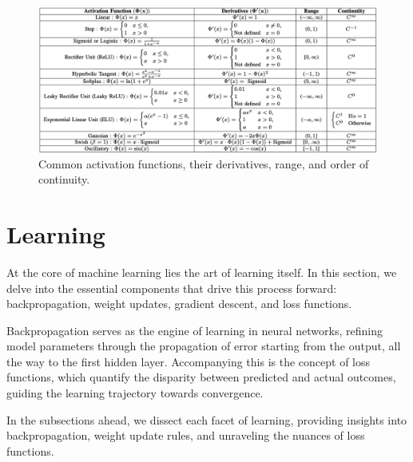 \documentclass{article}
\begin{document}
\begin{figure}[b]
  \label{actfun}
  \includegraphics{ActFunTable}
\caption{Common activation functions, their derivatives, range, and order of continuity.}
\end{figure}

\newpage
\section{Learning}
  \label{sec:Learning}
  At the core of machine learning lies the art of learning itself. In this section, we delve into the essential components that drive this process forward: backpropagation, weight updates, gradient descent, and loss functions.

Backpropagation serves as the engine of learning in neural networks, refining model parameters through the propagation of error starting from the output, all the way to the first hidden layer. Accompanying this is the concept of loss functions, which quantify the disparity between predicted and actual outcomes, guiding the learning trajectory towards convergence.

In the subsections ahead, we dissect each facet of learning, providing insights into backpropagation, weight update rules, and unraveling the nuances of loss functions.
  
\end{document}
